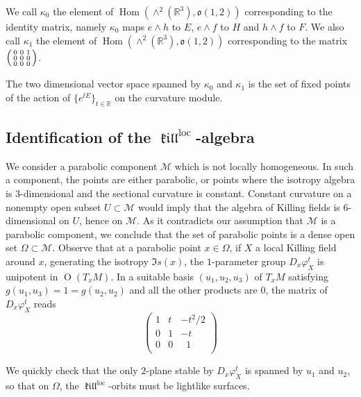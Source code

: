 \documentclass[11pt]{article}
\theoremstyle{definition}
\numberwithin{equation}{section}
\numberwithin{figure}{section}
\numberwithin{table}{section}
\DeclareMathOperator{\Hom}{Hom}
\DeclareMathOperator{\Omp}{O}%
\DeclareMathOperator{\loc}{loc}
\DeclareMathOperator{\kil}{{\mathfrak{kill}}}
\newcommand{\kiloc}{\kil^{\loc}}
\newcommand{\calm}{\mathcal{M}}
\newcommand*\RR{\mathbb{R}}
\newcommand{\oo}{{\mathfrak{o}}}
\newenvironment{smallpmatrix}{\left(\begin{smallmatrix}}{\end{smallmatrix}\right)}
\begin{document}
We call $\kappa_0$ the element of $\Hom(\wedge^2(\RR^3),\oo(1,2))$ corresponding to the identity matrix, namely $\kappa_0$ maps $e \wedge h$ to $E$, $e \wedge f$ to $H$ and $h \wedge f$ to $F$. We also call $\kappa_1$ the element of $\Hom(\wedge^2(\RR^3),\oo(1,2))$ corresponding to the matrix $\begin{smallpmatrix} 0&0&1\\ 0&0&0\\ 0&0&0\\
\end{smallpmatrix} $.

The two dimensional vector space spanned by $\kappa_0$ and $\kappa_1$ is the set of fixed points of the action of $\{ e^{tE} \}_{t \in \RR}$ on the curvature module.

\subsection{Identification of the \texorpdfstring{$\kiloc$}{kiloc}-algebra}
We consider a parabolic component $\calm$ which is not locally homogeneous. In such a component, the points are either parabolic, or points where the isotropy algebra is $3$-dimensional and the sectional curvature is constant. Constant curvature on a nonempty open subset $U \subset \calm$ would imply that the algebra of Killing fields is $6$-dimensional on $U$, hence on $\calm$. As it contradicts our assumption that $\calm$ is a parabolic component, we conclude that the set of parabolic points is a dense open set $\Omega \subset \calm$. Observe that at a parabolic point $x \in \Omega$, if $X$ a local Killing field around $x$, generating the isotropy ${\mathfrak Is}(x)$, the $1$-parameter group $D_x\varphi_X^t$ is unipotent in $\Omp(T_xM)$. In a suitable basis $(u_1,u_2,u_3)$ of $T_xM$ satisfying $g(u_1,u_3)=1=g(u_2,u_2)$ and all the other products are $0$, the matrix of $D_x\varphi_X^t$ reads
\[
\begin{pmatrix}
1&t&-t^2/2\\
0&1&-t\\
0&0&\;\;1\\
\end{pmatrix}
\]

We quickly check that the only $2$-plane stable by $D_x\varphi_X^t$ is spanned by $u_1$ and $u_2$, so that on $\Omega$, the $\kiloc$-orbits must be lightlike surfaces.
\end{document}
